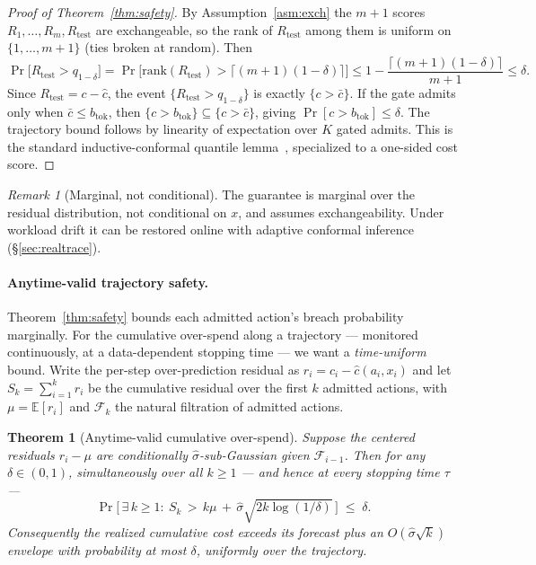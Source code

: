 \documentclass[11pt]{article}
\theoremstyle{plain}
\newtheorem{theorem}{Theorem}
\theoremstyle{definition}
\theoremstyle{remark}
\newtheorem{remark}{Remark}
\newcommand{\btok}{b_{\mathrm{tok}}}
\begin{document}
\begin{proof}[Proof of Theorem~\ref{thm:safety}]
By Assumption~\ref{asm:exch} the $m+1$ scores $R_1,\dots,R_m,R_{\mathrm{test}}$ are exchangeable, so the rank of $R_{\mathrm{test}}$ among them is uniform on $\{1,\dots,m+1\}$ (ties broken at random). Then
\[
\Pr\!\big[R_{\mathrm{test}} > q_{1-\delta}\big]
= \Pr\!\big[\text{rank}(R_{\mathrm{test}}) > \lceil (m+1)(1-\delta)\rceil\big]
\le 1 - \frac{\lceil (m+1)(1-\delta)\rceil}{m+1}
\le \delta .
\]
Since $R_{\mathrm{test}} = c - \hat c$, the event $\{R_{\mathrm{test}} > q_{1-\delta}\}$ is exactly $\{c > \bar c\}$. If the gate admits only when $\bar c \le \btok$, then $\{c > \btok\} \subseteq \{c > \bar c\}$, giving $\Pr[c > \btok] \le \delta$. The trajectory bound follows by linearity of expectation over $K$ gated admits. This is the standard inductive-conformal quantile lemma~\cite{vovk2005,angelopoulos2023}, specialized to a one-sided cost score.
\end{proof}

\begin{remark}[Marginal, not conditional]\label{rem:marginal}
The guarantee is marginal over the residual distribution, not conditional on $x$, and assumes exchangeability. Under workload drift it can be restored online with adaptive conformal inference~\cite{gibbs2021} (\S\ref{sec:realtrace}).
\end{remark}

\paragraph{Anytime-valid trajectory safety.} Theorem~\ref{thm:safety} bounds each admitted action's breach probability marginally. For the cumulative over-spend along a trajectory --- monitored continuously, at a data-dependent stopping time --- we want a \emph{time-uniform} bound. Write the per-step over-prediction residual as $r_i = c_i - \hat c(a_i,x_i)$ and let $S_k=\sum_{i=1}^{k} r_i$ be the cumulative residual over the first $k$ admitted actions, with $\mu=\mathbb{E}[r_i]$ and $\mathcal F_k$ the natural filtration of admitted actions.

\begin{theorem}[Anytime-valid cumulative over-spend]\label{thm:anytime}
Suppose the centered residuals $r_i-\mu$ are conditionally $\hat\sigma$-sub-Gaussian given $\mathcal F_{i-1}$. Then for any $\delta\in(0,1)$, simultaneously over all $k\ge1$ --- and hence at every stopping time $\tau$ ---
\begin{equation}
\Pr\!\Big[\,\exists\,k\ge 1:\ S_k \,>\, k\mu \,+\, \hat\sigma\sqrt{2k\log(1/\delta)}\,\Big]\;\le\;\delta .
\end{equation}
Consequently the realized cumulative cost exceeds its forecast plus an $O(\hat\sigma\sqrt{k})$ envelope with probability at most $\delta$, uniformly over the trajectory.
\end{theorem}
\end{document}
